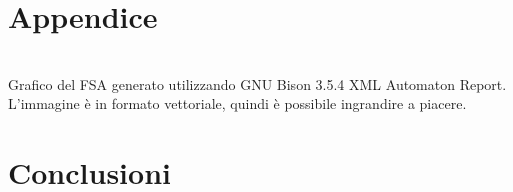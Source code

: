 \documentclass[10pt]{article}
\begin{document}
\clearpage
\section*{Appendice}\label{section:appendix}

\begin{center}
	\centering
	\\
	Grafico del FSA generato utilizzando GNU Bison 3.5.4 XML Automaton Report. L'immagine è in formato vettoriale, quindi è possibile ingrandire a piacere.
\end{center}
\clearpage
\section{Conclusioni}
\end{document}
